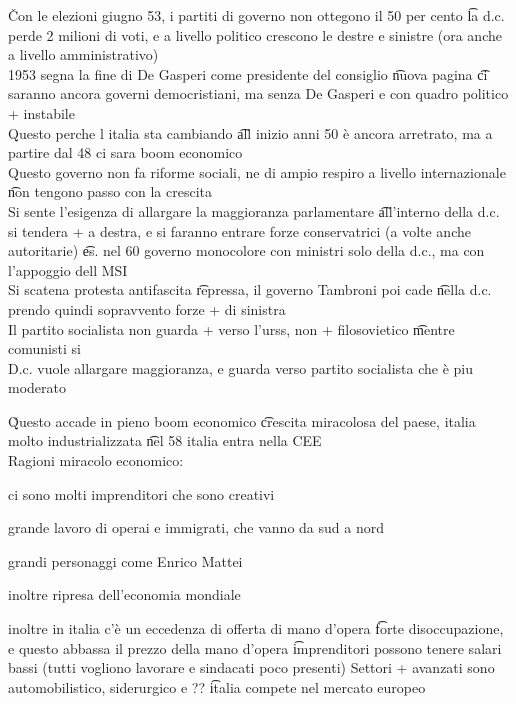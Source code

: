 \documentclass[12pt]{article}
\begin{document}
\v

Con le elezioni giugno 53, i partiti di governo non ottegono il 50 per cento \t la d.c. perde 2 milioni di voti, e a livello politico crescono le destre e sinistre (ora anche a livello amministrativo) \\
1953 segna la fine di De Gasperi come presidente del consiglio \t nuova pagina \t ci saranno ancora governi democristiani, ma senza De Gasperi e con quadro politico + instabile \\
Questo perche l italia sta cambiando \t all inizio anni 50 è ancora arretrato, ma a partire dal 48 ci sara boom economico \\
Questo governo non fa riforme sociali, ne di ampio respiro a livello internazionale \t non tengono passo con la crescita \\
Si sente l'esigenza di allargare la maggioranza parlamentare \t all'interno della d.c. si tendera + a destra, e si faranno entrare forze conservatrici (a volte anche autoritarie) \t es. nel 60 governo monocolore con ministri solo della d.c., ma con l'appoggio dell MSI \\
Si scatena protesta antifascita \t repressa, il governo Tambroni poi cade \t nella d.c. prendo quindi sopravvento forze + di sinistra \\
Il partito socialista non guarda + verso l'urss, non + filosovietico \t mentre comunisti si \\
D.c. vuole allargare maggioranza, e guarda verso partito socialista che è piu moderato 

\v

Questo accade in pieno boom economico \t crescita miracolosa del paese, italia molto industrializzata \t nel 58 italia entra nella CEE \\
Ragioni miracolo economico:
\bi
  \item ci sono molti imprenditori che sono creativi
  \item grande lavoro di operai e immigrati, che vanno da sud a nord
  \item grandi personaggi come Enrico Mattei
  \item inoltre ripresa dell'economia mondiale
  \item inoltre in italia c'è un eccedenza di offerta di mano d'opera \t forte disoccupazione, e questo abbassa il prezzo della mano d'opera \t imprenditori possono tenere salari bassi (tutti vogliono lavorare e sindacati poco presenti)
\ei
Settori + avanzati sono automobilistico, siderurgico e ?? \t italia compete nel mercato europeo
\end{document}

